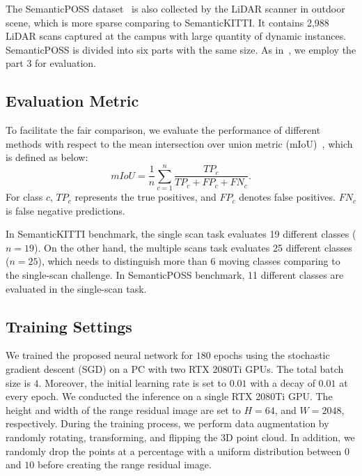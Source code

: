 \documentclass[letterpaper, 10 pt, journal, twoside]{ieeetran}
\begin{document}
The SemanticPOSS dataset~\cite{pan2020semanticposs} is also collected by the LiDAR scanner in outdoor scene, which is more sparse comparing to SemanticKITTI. It contains 2,988 LiDAR scans captured at the campus with large quantity of dynamic instances. SemanticPOSS is divided into six parts with the same size. As in~\cite{pan2020semanticposs}, we employ the part 3 for evaluation.



\subsection{Evaluation Metric}
\label{sec:eva}
To facilitate the fair comparison, we evaluate the performance of different methods with respect to the mean intersection over union metric (mIoU)~\cite{behley2019semantickitti}, which is defined as below: 
\begin{equation}
            \label{slice}
         	mIoU = \frac{1}{n}\sum_{c=1}^{n}{\frac{TP_c}{TP_c+FP_c+FN_c}}.
\end{equation}
For class $c$, $TP_c$ represents the true positives, and $FP_c$ denotes false positives. $FN_c$ is false negative predictions. 

In SemanticKITTI benchmark, the single scan task evaluates 19 different classes ($n = 19$). On the other hand, the multiple scans task evaluates 25 different classes ($n = 25$), which needs to distinguish more than 6 moving classes comparing to the single-scan challenge. 
In SemanticPOSS benchmark, 11 different classes are evaluated in the single-scan task.



\subsection{Training Settings}
We trained the proposed neural network for $180$ epochs using the stochastic gradient descent (SGD) on a PC with two RTX 2080Ti GPUs. The total batch size is $4$. Moreover, the initial learning rate is set to $0.01$ with a decay of $0.01$ at every epoch. We conducted the inference on a single RTX 2080Ti GPU. The height and width of the range residual image are set to $H = 64$, and $W = 2048$, respectively. During the training process, we perform data augmentation by randomly rotating, transforming, and flipping the 3D point cloud. In addition, we randomly drop the points at a percentage with a uniform distribution between $0$ and $10$ before creating the range residual image.
\end{document}
